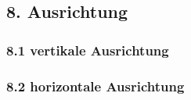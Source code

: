 \subsection{8. Ausrichtung}

\subsubsection{8.1 vertikale Ausrichtung}

\subsubsection{8.2 horizontale Ausrichtung}